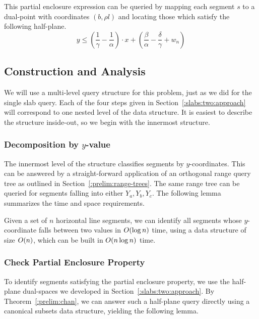 \noindent This partial enclosure expression can be queried by mapping each segment $s$ to a dual-point with coordinates $(b, \rho l)$ and locating those which satisfy the following half-plane.
\[
y \leq \left ( \frac{1}{\gamma} - \frac{1}{\alpha} \right ) \cdot x + \left ( \frac{\beta}{\alpha} - \frac{\delta}{\gamma} + w_n \right )
\]


\subsection{Construction and Analysis}
\label{:slabs:two:analysis}

We will use a multi-level query structure for this problem, just as we did for the single slab query.
Each of the four steps given in Section~\ref{:slabs:two:approach} will correspond to one nested level of the data structure.
It is easiest to describe the structure inside-out, so we begin with the innermost structure.

\subsubsection{Decomposition by $y$-value}

The innermost level of the structure classifies segments by $y$-coordinates. 
This can be answered by a straight-forward application of an orthogonal range query tree as outlined in Section~\ref{:prelim:range-trees}. 
The same range tree can be queried for segments falling into either $Y_a, Y_b, Y_c$. 
The following lemma summarizes the time and space requirements.

\begin{lemma}
\label{lem:slabs:two:step1}
Given a set of $n$ horizontal line segments, we can identify all segments whose $y$-coordinate falls between two values in $O\!\left(\log{n}\right)$ time, using a data structure of size $O\!\left(n\right)$, which can be built in $O\!\left(n\log{n}\right)$ time.
\end{lemma}


\subsubsection{Check Partial Enclosure Property}

To identify segments satisfying the partial enclosure property, we use the half-plane dual-spaces we developed in Section~\ref{:slabs:two:approach}. 
By Theorem~\ref{:prelim:chan}, we can answer such a half-plane query directly using a canonical subsets data structure, yielding the following lemma.

